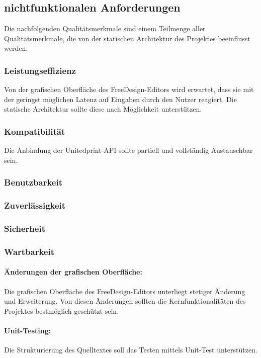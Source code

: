 \subsection{nichtfunktionalen Anforderungen}
Die nachfolgenden Qualitätsmerkmale sind einem Teilmenge aller Qualitätsmerkmale, die von der statischen Architektur des Projektes beeinflusst werden.   

\subsubsection{Leistungseffizienz}
Von der grafischen Oberfläche des FreeDesign-Editors wird erwartet, dass sie mit der geringst möglichen Latenz auf Eingaben durch den Nutzer reagiert. Die statische Architektur sollte diese nach Möglichkeit unterstützen.

\subsubsection{Kompatibilität}
Die Anbindung der Unitedprint-API sollte partiell und vollständig Austauschbar sein. 

\subsubsection{Benutzbarkeit}

\subsubsection{Zuverlässigkeit}

\subsubsection{Sicherheit}

\subsubsection{Wartbarkeit}
\paragraph{Änderungen der grafischen Oberfläche:}
Die grafischen Oberfläche des FreeDesign-Editors unterliegt stetiger Änderung und Erweiterung. 
Von diesen Änderungen sollten die Kernfunktionalitäten des Projektes bestmöglich geschützt sein. 

\paragraph{Unit-Testing:}
Die Strukturierung des Quelltextes soll das Testen mittels Unit-Test unterstützen. 

